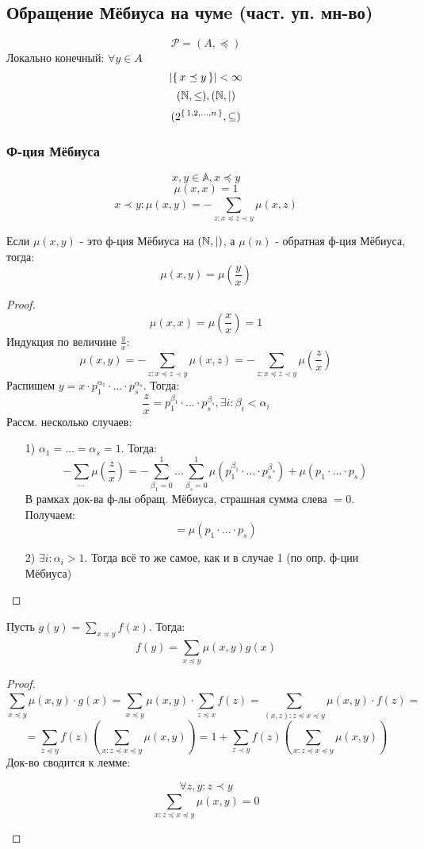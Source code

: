\subsection{Обращение Мёбиуса на чумe (част. уп. мн-во)}
\[
  \mathscr{P} = (A, \preceq)
\]
Локально конечный: $\forall y \in A$
\[
\left|\set{ x \preceq y }\right| < \infty
\]
\[
  (\mathbb{N}, \leq), (\mathbb{N}, |)
\]
\[
  (2^{\set{1, 2, \ldots, n}}, \subseteq)
\]
\subsubsection{Ф-ция Мёбиуса}
\[
x, y \in \mathbb{A}, x \preceq y
\]
\[
\mu(x, x) = 1
\]
\[
x \prec y \colon \mu(x, y) = -\sum_{z \colon x \preceq z \prec y}^{} \mu(x, z)
\]
\begin{theorem}
Если $\mu(x, y)$ - это ф-ция Мёбиуса на $(\mathbb{N}, |)$, а $\mu(n)$ - обратная ф-ция Мёбиуса, тогда:
\[
\mu(x, y) = \mu\left(\frac{y}{x}\right)
\]
\end{theorem}
\begin{proof}
\[
\mu(x, x) = \mu\left(\frac{x}{x}\right) = 1
\]
Индукция по величине $\frac{y}{x}$: 
\[
\mu(x, y) = -\sum_{z \colon x \preceq z \prec y}^{} \mu(x, z) = -\sum_{z \colon x \preceq z \prec y}^{} \mu\left(\frac{z}{x}\right)
\]
Распишем $y = x \cdot p_1^{\alpha_1} \cdot \ldots \cdot p_s^{\alpha_s}$. Тогда:
\[
\frac{z}{x} = p_1^{\beta_1} \cdot \ldots \cdot p_s^{\beta_s}, \exists i \colon \beta_i < \alpha_i
\]
Рассм. несколько случаев:
\begin{itemize}
  \item [1) ] $\alpha_1 = \ldots = \alpha_s = 1$. Тогда:
\[
-\sum_{\ldots}^{} \mu\left(\frac{z}{x}\right) = -\sum_{\beta_1 = 0}^{1} \ldots \sum_{\beta_s = 0}^{1} \mu\left(p_1^{\beta_1}\cdot\ldots\cdot p_s^{\beta_s}\right) + \mu\left(p_1 \cdot \ldots \cdot p_s\right)
\]
В рамках док-ва ф-лы обращ. Мёбиуса, страшная сумма слева $= 0$. Получаем:
\[
 = \mu(p_1 \cdot \ldots \cdot p_s)
\]
  \item [2) ] $\exists i \colon \alpha_i > 1$. Тогда всё то же самое, как и в случае 1 (по опр. ф-ции Мёбиуса)
\end{itemize}
\end{proof}
\begin{theorem}
  Пусть $g(y) = \sum_{x \preceq y}^{} f(x)$. Тогда:
  \[
    f(y) = \sum_{x \preceq y}^{} \mu(x, y) g(x)
  \]
\end{theorem}
\begin{proof}
\[
\sum_{x \preceq y}^{} \mu(x, y) \cdot g(x) =\sum_{x \preceq y}^{} \mu(x, y) \cdot \sum_{z \preceq x}^{}  f(z) = \sum_{(x, z) \colon z \preceq x \preceq y}^{} \mu(x, y) \cdot f(z) = 
\]
\[
 = \sum_{z \preceq y}^{} f(z) \left(\sum_{x \colon z \preceq x \preceq y}^{} \mu(x, y)\right) = 1 + \sum_{z \prec y}^{} f(z) \left(\sum_{x \colon z \preceq x \preceq y}^{} \mu(x, y)\right)
\]
Док-во сводится к лемме:
\begin{lemma}
\[
\forall z, y \colon z \prec y
\]
\[
\sum_{x \colon z \preceq x \preceq y}^{}\mu(x, y) = 0
\]
\end{lemma}
\end{proof}
